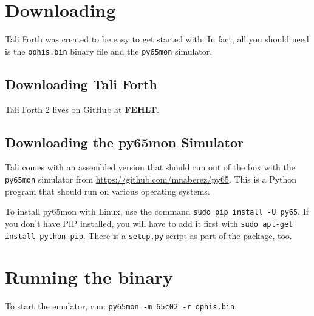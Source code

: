 \section{Downloading}

Tali Forth was created to be easy to get started with. In fact, all you should
need is the \texttt{ophis.bin} binary file and the \texttt{py65mon} simulator.

\subsection{Downloading Tali Forth}

Tali Forth 2 lives on GitHub at \textbf{FEHLT}.

\subsection{Downloading the py65mon Simulator}

Tali comes with an assembled version that should run out of the box with the
\texttt{py65mon} simulator from
\href{https://github.com/mnaberez/py65}{https://github.com/mnaberez/py65}. This
is a Python program that should run on various operating systems. 

To install py65mon with Linux, use the command \texttt{sudo pip install -U
py65}. If you don't have PIP installed, you will have to add it first with
\texttt{sudo apt-get install python-pip}.  There is a \texttt{setup.py} script
as part of the package, too. 

\section{Running the binary}

To start the emulator, run: \texttt{py65mon -m 65c02 -r ophis.bin}.

